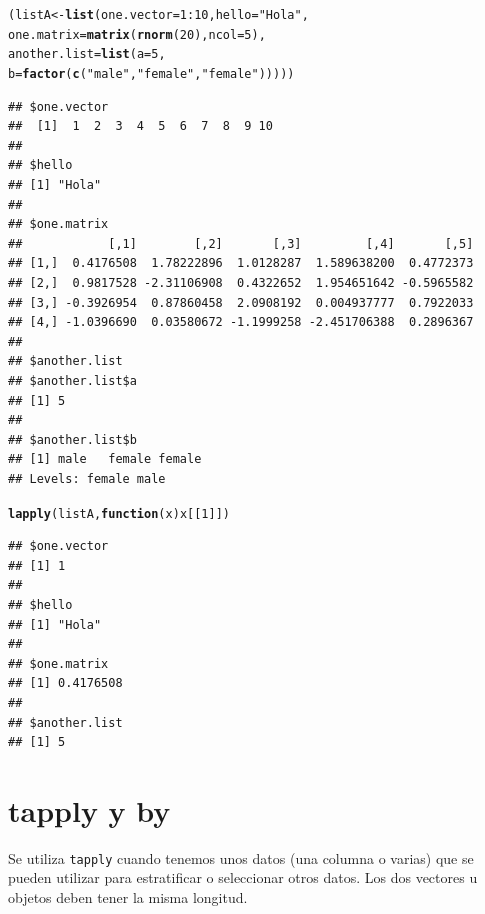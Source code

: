 \documentclass{config/apuntes}\usepackage[]{graphicx}\usepackage[]{xcolor}
\makeatletter
\newcommand{\hlnum}[1]{\textcolor[rgb]{0.686,0.059,0.569}{#1}}%
\newcommand{\hlsng}[1]{\textcolor[rgb]{0.192,0.494,0.8}{#1}}%
\newcommand{\hlopt}[1]{\textcolor[rgb]{0,0,0}{#1}}%
\newcommand{\hldef}[1]{\textcolor[rgb]{0.345,0.345,0.345}{#1}}%
\newcommand{\hlkwa}[1]{\textcolor[rgb]{0.161,0.373,0.58}{\textbf{#1}}}%
\newcommand{\hlkwb}[1]{\textcolor[rgb]{0.69,0.353,0.396}{#1}}%
\newcommand{\hlkwc}[1]{\textcolor[rgb]{0.333,0.667,0.333}{#1}}%
\newcommand{\hlkwd}[1]{\textcolor[rgb]{0.737,0.353,0.396}{\textbf{#1}}}%
\newenvironment{kframe}{%
 \def\at@end@of@kframe{}%
 \ifinner\ifhmode%
  \def\at@end@of@kframe{\end{minipage}}%
  \begin{minipage}{\columnwidth}%
 \fi\fi%
 \def\FrameCommand##1{\hskip\@totalleftmargin \hskip-\fboxsep
 \colorbox{shadecolor}{##1}\hskip-\fboxsep
     \hskip-\linewidth \hskip-\@totalleftmargin \hskip\columnwidth}%
 \MakeFramed {\advance\hsize-\width
   \@totalleftmargin\z@ \linewidth\hsize
   \@setminipage}}%
 {\par\unskip\endMakeFramed%
 \at@end@of@kframe}
\newenvironment{knitrout}{}{} %
\newcommand{\code}[1]{\texttt{#1}}
\makeatother
\begin{document}
\begin{knitrout}
\color{fgcolor}\begin{kframe}
\begin{alltt}
\hldef{(listA} \hlkwb{<-} \hlkwd{list}\hldef{(}\hlkwc{one.vector} \hldef{=} \hlnum{1}\hlopt{:}\hlnum{10}\hldef{,}  \hlkwc{hello} \hldef{=} \hlsng{"Hola"}\hldef{,}
               \hlkwc{one.matrix} \hldef{=} \hlkwd{matrix}\hldef{(}\hlkwd{rnorm}\hldef{(}\hlnum{20}\hldef{),} \hlkwc{ncol} \hldef{=} \hlnum{5}\hldef{),}
               \hlkwc{another.list} \hldef{=} \hlkwd{list}\hldef{(}\hlkwc{a} \hldef{=} \hlnum{5}\hldef{,}
                 \hlkwc{b} \hldef{=} \hlkwd{factor}\hldef{(}\hlkwd{c}\hldef{(}\hlsng{"male"}\hldef{,} \hlsng{"female"}\hldef{,} \hlsng{"female"}\hldef{)))))}
\end{alltt}
\begin{verbatim}
## $one.vector
##  [1]  1  2  3  4  5  6  7  8  9 10
## 
## $hello
## [1] "Hola"
## 
## $one.matrix
##            [,1]        [,2]       [,3]         [,4]       [,5]
## [1,]  0.4176508  1.78222896  1.0128287  1.589638200  0.4772373
## [2,]  0.9817528 -2.31106908  0.4322652  1.954651642 -0.5965582
## [3,] -0.3926954  0.87860458  2.0908192  0.004937777  0.7922033
## [4,] -1.0396690  0.03580672 -1.1999258 -2.451706388  0.2896367
## 
## $another.list
## $another.list$a
## [1] 5
## 
## $another.list$b
## [1] male   female female
## Levels: female male
\end{verbatim}
\begin{alltt}
\hlkwd{lapply}\hldef{(listA,} \hlkwa{function}\hldef{(}\hlkwc{x}\hldef{) x[[}\hlnum{1}\hldef{]])}
\end{alltt}
\begin{verbatim}
## $one.vector
## [1] 1
## 
## $hello
## [1] "Hola"
## 
## $one.matrix
## [1] 0.4176508
## 
## $another.list
## [1] 5
\end{verbatim}
\end{kframe}
\end{knitrout}

\section{tapply y by}
Se utiliza \code{tapply} cuando tenemos unos datos (una columna o varias) que se pueden utilizar para estratificar o seleccionar otros datos. Los dos vectores u objetos deben tener la misma longitud. 
\end{document}

